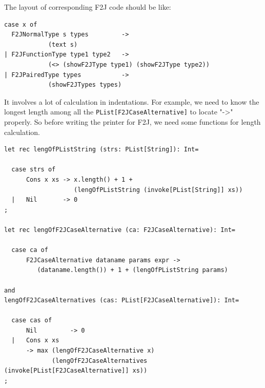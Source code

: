 The layout of corresponding F2J code should be like:
\begin{lstlisting}
case x of
  F2JNormalType s types         ->
            (text s)
| F2JFunctionType type1 type2   ->
            (<> (showF2JType type1) (showF2JType type2))
| F2JPairedType types           ->
            (showF2JTypes types)
\end{lstlisting}

It involves a lot of calculation in indentations. For example, we need to know the longest length among all the \texttt{PList[F2JCaseAlternative]} to locate "->" properly. So before writing the printer for F2J, we need some functions for length calculation.
\begin{lstlisting}
let rec lengOfPListString (strs: PList[String]): Int=

  case strs of
      Cons x xs -> x.length() + 1 +
                   (lengOfPListString (invoke[PList[String]] xs))
  |   Nil       -> 0
;

let rec lengOfF2JCaseAlternative (ca: F2JCaseAlternative): Int=

  case ca of
      F2JCaseAlternative dataname params expr ->
         (dataname.length()) + 1 + (lengOfPListString params)

and
lengOfF2JCaseAlternatives (cas: PList[F2JCaseAlternative]): Int=

  case cas of
      Nil         -> 0
  |   Cons x xs
      -> max (lengOfF2JCaseAlternative x)
             (lengOfF2JCaseAlternatives (invoke[PList[F2JCaseAlternative]] xs))
;
\end{lstlisting}

